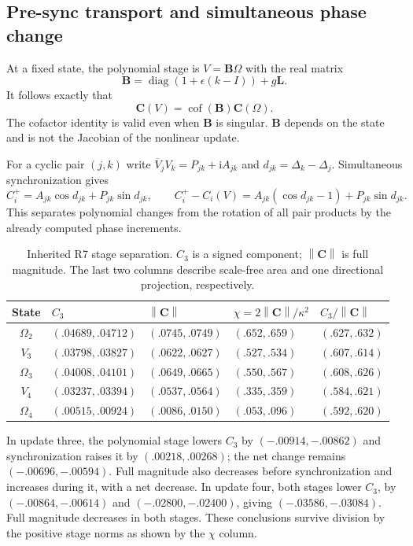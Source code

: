\documentclass[11pt,a4paper]{article}
\numberwithin{equation}{section}
\newcommand{\ii}{\mathrm i}
\newcommand{\norm}[1]{\left\lVert#1\right\rVert}
\newcommand{\cof}{\operatorname{cof}}
\newcommand{\diag}{\operatorname{diag}}
\newcommand{\chiral}{\mathbf C}
\newcommand{\Lmat}{\mathbf L}
\newcommand{\Bmat}{\mathbf B}
\begin{document}
\subsection{Pre-sync transport and simultaneous phase change}
At a fixed state, the polynomial stage is $V=\Bmat\Omega$ with the real
matrix
\[
\Bmat=\diag(1+\epsilon(k-I))+g\Lmat .
\]
It follows exactly that
\begin{equation}\label{eq:cofactor}
\chiral(V)=\cof(\Bmat)\chiral(\Omega).
\end{equation}
The cofactor identity is valid even when $\Bmat$ is singular. $\Bmat$
depends on the state and is not the Jacobian of the nonlinear update.

For a cyclic pair $(j,k)$ write
$\overline V_jV_k=P_{jk}+\ii A_{jk}$ and
$d_{jk}=\Delta_k-\Delta_j$. Simultaneous synchronization gives
\begin{equation}\label{eq:pairchange}
C_i^+=A_{jk}\cos d_{jk}+P_{jk}\sin d_{jk},\qquad
C_i^+-C_i(V)=A_{jk}(\cos d_{jk}-1)+P_{jk}\sin d_{jk}.
\end{equation}
This separates polynomial changes from the rotation of all pair products
by the already computed phase increments.

\begin{table}[htbp]
\centering\small
\begin{tabular}{@{}cllll@{}}
\toprule
State&$C_3$&$\norm{\chiral}$&$\chi=2\norm{\chiral}/\kappa^2$
&$C_3/\norm{\chiral}$\\ \midrule
$\Omega_2$&$(.04689,.04712)$&$(.0745,.0749)$&$(.652,.659)$&$(.627,.632)$\\
$V_3$&$(.03798,.03827)$&$(.0622,.0627)$&$(.527,.534)$&$(.607,.614)$\\
$\Omega_3$&$(.04008,.04101)$&$(.0649,.0665)$&$(.550,.567)$&$(.608,.626)$\\
$V_4$&$(.03237,.03394)$&$(.0537,.0564)$&$(.335,.359)$&$(.584,.621)$\\
$\Omega_4$&$(.00515,.00924)$&$(.0086,.0150)$&$(.053,.096)$&$(.592,.620)$\\
\bottomrule
\end{tabular}
\caption{Inherited R7 stage separation. $C_3$ is a signed component;
$\norm{\chiral}$ is full magnitude. The last two columns describe scale-free
area and one directional projection, respectively.}
\label{tab:chiral}
\end{table}

In update three, the polynomial stage lowers $C_3$ by
$(-.00914,-.00862)$ and synchronization raises it by $(.00218,.00268)$;
the net change remains $(-.00696,-.00594)$. Full magnitude also decreases
before synchronization and increases during it, with a net decrease.
In update four, both stages lower $C_3$, by $(-.00864,-.00614)$ and
$(-.02800,-.02400)$, giving $(-.03586,-.03084)$. Full magnitude decreases
in both stages. These conclusions survive division by the positive
stage norms as shown by the $\chi$ column.
\end{document}
